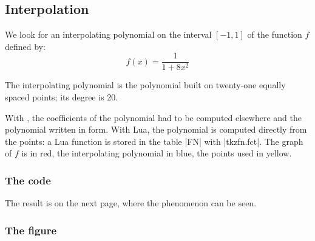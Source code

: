 \subsection{Interpolation}

We look for an interpolating polynomial on the interval $[-1, 1]$ of the function $f$ defined by:
\[
  f(x)=\frac{1}{1+8x^2}
\]

The interpolating polynomial is the  polynomial built on twenty-one equally spaced points; its degree is $20$.

With , the coefficients of the polynomial had to be computed elsewhere and the polynomial written in  form. With Lua, the polynomial is computed directly from the points: a Lua function is stored in the table |FN| with |tkzfn.fct|. The graph of $f$ is in red, the interpolating polynomial in blue, the points used in yellow.

\subsubsection{The code}
\begin{tkzexample}
\end{tkzexample}

The result is on the next page, where the  phenomenon can be seen.

\subsubsection{The figure}

